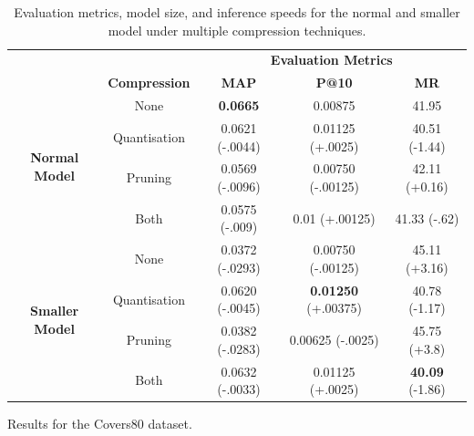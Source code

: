 \documentclass{article}
\begin{document}
{\begin{table}[h]
    \vspace{2em}
    \begin{subtable}{\textwidth}
        \centering
        \begin{tabular}{|c|c|c|c|c|}
            \hline
            \rowcolor{lightgray} & & \multicolumn{3}{|c|}{\textbf{Evaluation Metrics}} \\
            \cline{2-5}
            \rowcolor{lightgray}& \textbf{Compression} & \textbf{MAP} & \textbf{P@10} & \textbf{MR} \\
            \hline
            \multirow{4}{*}{\textbf{Normal Model}} & None & \textbf{0.0665} & 0.00875 & 41.95 \\
            \cline{2-5}
            & Quantisation & \cellcolor{red!15}0.0621 (-.0044) & \cellcolor{green!10}0.01125 (+.0025) & \cellcolor{green!30}40.51 (-1.44) \\
            \cline{2-5}
            & Pruning & \cellcolor{red!30}0.0569 (-.0096) & \cellcolor{red!20}0.00750 (-.00125) & \cellcolor{red!10}42.11 (+0.16) \\
            \cline{2-5}
            & Both & \cellcolor{red!30}0.0575 (-.009) & \cellcolor{green!20}0.01 (+.00125) & \cellcolor{green!15}41.33 (-.62) \\
            \hline
            \multirow{4}{*}{\textbf{Smaller Model}} & None & \cellcolor{red!50}0.0372 (-.0293) & \cellcolor{red!20}0.00750 (-.00125) & \cellcolor{red!45}45.11 (+3.16) \\
            \cline{2-5}
            & Quantisation & \cellcolor{red!15}0.0620 (-.0045) & \cellcolor{green!50}\textbf{0.01250} (+.00375) & \cellcolor{green!25}40.78 (-1.17) \\
            \cline{2-5}
            & Pruning & \cellcolor{red!50}0.0382 (-.0283) & \cellcolor{red!10}0.00625 (-.0025) & \cellcolor{red!50}45.75 (+3.8) \\
            \cline{2-5}
            & Both & \cellcolor{red!10}0.0632 (-.0033) & \cellcolor{green!10}0.01125 (+.0025) & \cellcolor{green!35}\textbf{40.09} (-1.86) \\
            \hline
        \end{tabular}
        \caption{Results for the Covers80 dataset.}
        \label{fig:covers80results}
    \end{subtable}
    \caption{Evaluation metrics, model size, and inference speeds for the normal and smaller model under multiple compression techniques.}
    \label{tbl:compressionresults}
\end{table}

}
\end{document}
